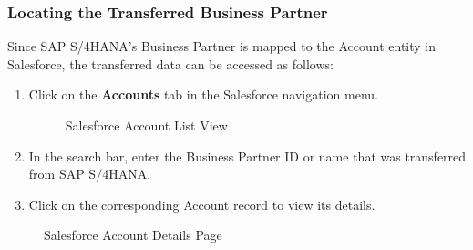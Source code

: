 \subsubsection{Locating the Transferred Business Partner}
Since SAP S/4HANA's Business Partner is mapped to the Account entity in Salesforce, the transferred data can be accessed as follows:

\begin{enumerate}
    \item Click on the \textbf{Accounts} tab in the Salesforce navigation menu.

    \begin{figure}[H]
    \centering
    \caption{Salesforce Account List View}
    
    \end{figure}
    
    \item In the search bar, enter the Business Partner ID or name that was transferred from SAP S/4HANA.
    \item Click on the corresponding Account record to view its details.
\end{enumerate}

    \begin{figure}[H]
    \centering
    \caption{Salesforce Account Details Page}
    
    \end{figure}

